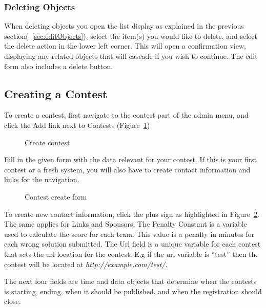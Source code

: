 \subsubsection{Deleting Objects}

When deleting objects you open the list display as explained in the
previous section(~\ref{sec:editObjects}), select the item(s) you would like to delete,
and select the delete action in the lower left corner. This will open a
confirmation view, displaying any related objects that will cascade if
you wish to continue. The edit form also includes a delete button.



\subsection{Creating a Contest}

To create a contest, first navigate to the contest part of the admin
menu, and click the Add link next to Contests (Figure~\ref{fig:createContest})

\begin{figure}
\centering
	\caption{Create contest}
	\label{fig:createContest}
\end{figure}

Fill in the given form with the data relevant for your contest. If this
is your first contest or a fresh system, you will also have to create
contact information and links for the navigation.

\begin{figure}
\centering
	\caption{Contest create form}
	\label{fig:contestCreateForm}
\end{figure}

To create new contact information, click the plus sign as highlighted in
Figure~\ref{fig:contestCreateForm}. The same applies for Links and Sponsors. The Penalty
Constant is a variable used to calculate the score for each team. This
value is a penalty in minutes for each wrong solution submitted. The
Url field is a unique variable for each contest that sets the url
location for the contest. E.g if the url variable is
{\textquotedblleft}test{\textquotedblright} then the contest will be
located at \textit{http://example.com/test/}. 

The next four fields are time and data objects that determine when the
contests is starting, ending, when it should be published, and when the
registration should close.

